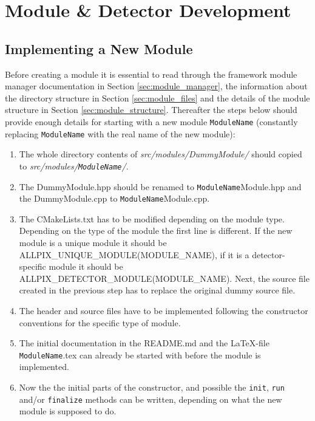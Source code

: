 \section{Module \& Detector Development}
\subsection{Implementing a New Module}
\label{sec:building_new_module}
Before creating a module it is essential to read through the framework module manager documentation in Section \ref{sec:module_manager}, the information about the directory structure in Section \ref{sec:module_files} and the details of the module structure in Section \ref{sec:module_structure}. Thereafter the steps below should provide enough details for starting with a new module \texttt{ModuleName} (constantly replacing  \texttt{ModuleName} with the real name of the new module):
\begin{enumerate}
\item The whole directory contents of \textit{src/modules/DummyModule/} should copied to \textit{src/modules/\texttt{ModuleName}/}.
\item The DummyModule.hpp should be renamed to \texttt{ModuleName}Module.hpp and the DummyModule.cpp to \texttt{ModuleName}Module.cpp.
\item The CMakeLists.txt has to be modified depending on the module type. Depending on the type of the module the first line is different. If the new module is a unique module it should be ALLPIX\_UNIQUE\_MODULE(MODULE\_NAME), if it is a detector-specific module it should be ALLPIX\_DETECTOR\_MODULE(MODULE\_NAME). Next, the source file created in the previous step has to replace the original dummy source file.
\item The header and source files have to be implemented following the constructor conventions for the specific type of module.
\item The initial documentation in the README.md and the \LaTeX-file \texttt{ModuleName}.tex can already be started with before the module is implemented.
\item Now the the initial parts of the constructor, and possible the \texttt{init}, \texttt{run} and/or \texttt{finalize} methods can be written, depending on what the new module is supposed to do.
\end{enumerate}

